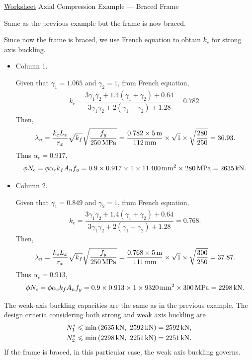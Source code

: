 \begin{exmp}\href{run:./WORKSHEET/CH04/EX4.ACSF.sm}{Worksheet}
Axial Compression Example --- Braced Frame

Same as the previous example but the frame is now braced.
\begin{figure}[H]

\end{figure}
\end{exmp}
\begin{solution}
Since now the frame is braced, we use French equation to obtain $k_e$ for strong axis buckling.
\begin{itemize}
\item Column 1.

Given that $\gamma_1=1.065$ and $\gamma_2=1$, from French equation,
\begin{gather*}
k_e=\dfrac{3\gamma_1\gamma_2+1.4\left(\gamma_1+\gamma_2\right)+0.64}{3\gamma_1\gamma_2+2\left(\gamma_1+\gamma_2\right)+1.28}=0.782.
\end{gather*}
Then,
\begin{gather*}
\lambda_n=\dfrac{k_eL_x}{r_x}\sqrt{k_f}\sqrt{\dfrac{f_y}{\SI{250}{\mega\pascal}}}=\dfrac{0.782\times\SI{5}{\meter}}{\SI{112}{\milli\meter}}\times\sqrt{1}\times\sqrt{\dfrac{280}{250}}=36.93.
\end{gather*}
Thus $\alpha_c=0.917$,
\begin{gather*}
\phi{}N_c=\phi\alpha_ck_fA_nf_y=0.9\times0.917\times1\times\SI{11400}{\milli\meter^2}\times\SI{280}{\mega\pascal}=\SI{2635}{\kilo\newton}.
\end{gather*}
\item Column 2.

Given that $\gamma_1=0.849$ and $\gamma_2=1$, from French equation,
\begin{gather*}
k_e=\dfrac{3\gamma_1\gamma_2+1.4\left(\gamma_1+\gamma_2\right)+0.64}{3\gamma_1\gamma_2+2\left(\gamma_1+\gamma_2\right)+1.28}=0.768.
\end{gather*}
Then,
\begin{gather*}
\lambda_n=\dfrac{k_eL_x}{r_x}\sqrt{k_f}\sqrt{\dfrac{f_y}{\SI{250}{\mega\pascal}}}=\dfrac{0.768\times\SI{5}{\meter}}{\SI{111}{\milli\meter}}\times\sqrt{1}\times\sqrt{\dfrac{300}{250}}=37.87.
\end{gather*}
Thus $\alpha_c=0.913$,
\begin{gather*}
\phi{}N_c=\phi\alpha_ck_fA_nf_y=0.9\times0.913\times1\times\SI{9320}{\milli\meter^2}\times\SI{300}{\mega\pascal}=\SI{2298}{\kilo\newton}.
\end{gather*}
\end{itemize}

The weak-axis buckling capacities are the same as in the previous example.
The design criteria considering both strong and weak axis buckling are
\begin{gather*}
N^*_1\leqslant\min\left(\SI{2635}{\kilo\newton},~\SI{2592}{\kilo\newton}\right)=\SI{2592}{\kilo\newton},\\
N^*_2\leqslant\min\left(\SI{2298}{\kilo\newton},~\SI{2251}{\kilo\newton}\right)=\SI{2251}{\kilo\newton}.
\end{gather*}
If the frame is braced, in this particular case, the weak axis buckling governs.
\end{solution}
